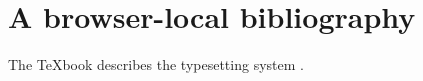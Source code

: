 \documentclass{article}
\begin{document}
\section{A browser-local bibliography}
The TeXbook describes the typesetting system \cite{knuth}.

\printbibliography
\end{document}
